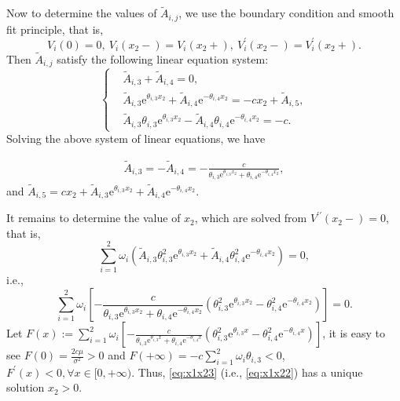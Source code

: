 \documentclass[11pt,reqno]{article}%
\numberwithin{equation}{section}
\begin{document}
Now to determine the values of $\tilde{A}_{i,j}$, we use the boundary condition and smooth fit principle, that is,
\begin{equation}\nonumber
V_i(0) = 0,\ V_i(x_2 -) = V_i(x_2+),\ V^\prime_i(x_2 -) = V^\prime_i(x_2+).
\end{equation}
Then $\tilde{A}_{i,j}$ satisfy the following linear equation system:
\begin{equation}\nonumber
\left\{\begin{aligned}
& \tilde{A}_{i,3} + \tilde{A}_{i,4} = 0, \\
& \tilde{A}_{i,3} \mathrm{e}^{\theta_{i,3}x_2} + \tilde{A}_{i,4} \mathrm{e}^{-\theta_{i,4}x_2} = -cx_2 + \tilde{A}_{i,5},\\
& \tilde{A}_{i,3}\theta_{i,3} \mathrm{e}^{\theta_{i,3}x_2} - \tilde{A}_{i,4} \theta_{i,4}\mathrm{e}^{-\theta_{i,4}x_2}  = -c.
\end{aligned}\right.
\end{equation}
Solving the above system of linear equations, we have

\begin{equation}\nonumber
\begin{aligned}
 \tilde{A}_{i,3} =- \tilde{A}_{i,4}=-\frac{c}{\theta_{i,3} \mathrm{e}^{\theta_{i,3}x_2}+\theta_{i,4}\mathrm{e}^{-\theta_{i,4}x_2}},\end{aligned}
\end{equation}
and $\tilde{A}_{i,5}=cx_2+\tilde{A}_{i,3} \mathrm{e}^{\theta_{i,3}x_2} + \tilde{A}_{i,4} \mathrm{e}^{-\theta_{i,4}x_2}$.

It remains to determine the value of $x_2$, which are solved from $V^{\prime\prime}(x_2-) = 0$, that is,
\begin{equation}\label{eq:x1x22}
\sum\limits_{i=1}^{2}\omega_i\left(\tilde{A}_{i,3}\theta_{i,3}^2 \mathrm{e}^{\theta_{i,3}x_2} + \tilde{A}_{i,4} \theta_{i,4}^2\mathrm{e}^{-\theta_{i,4}x_2}\right) = 0,
\end{equation}
i.e.,
\begin{equation}\label{eq:x1x23}
\sum\limits_{i=1}^{2}\omega_i\left[-\frac{c}{\theta_{i,3} \mathrm{e}^{\theta_{i,3}x_2}+\theta_{i,4}\mathrm{e}^{-\theta_{i,4}x_2}}\left(\theta_{i,3}^2 \mathrm{e}^{\theta_{i,3}x_2} - \theta_{i,4}^2\mathrm{e}^{-\theta_{i,4}x_2}\right)\right] = 0.
\end{equation}
Let $F(x):=\sum\limits_{i=1}^{2}\omega_i\left[-\frac{c}{\theta_{i,3} \mathrm{e}^{\theta_{i,3}x}+\theta_{i,4}\mathrm{e}^{-\theta_{i,4}x}}\left(\theta_{i,3}^2 \mathrm{e}^{\theta_{i,3}x} - \theta_{i,4}^2\mathrm{e}^{-\theta_{i,4}x}\right)\right]$, it is easy to see $F(0)=\frac{2c\mu}{\sigma^2}>0$ and $F(+\infty)=-c\sum\limits_{i=1}^{2}\omega_i\theta_{i,3}<0$, $F^{\prime}(x)<0, \forall x\in [0,+\infty)$. Thus, \eqref{eq:x1x23} (i.e., \eqref{eq:x1x22}) has a unique solution $x_2>0$.
\end{document}
